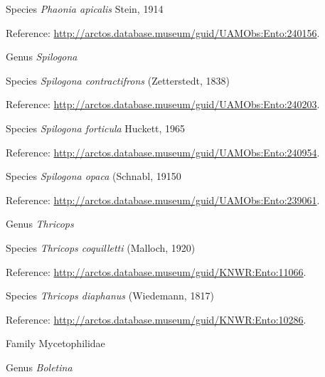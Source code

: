 \documentclass[9pt, article]{memoir}
\begin{document}
\begin{multicols}{2}
\vspace{6pt}\noindent\hspace{36pt}Species \textit{Phaonia apicalis} Stein, 1914


Reference: 
\url{http://arctos.database.museum/guid/UAMObs:Ento:240156}.

\vspace{6pt}\noindent\hspace{30pt}Genus \textit{Spilogona}


\vspace{6pt}\noindent\hspace{36pt}Species \textit{Spilogona contractifrons} (Zetterstedt, 1838)


Reference: 
\url{http://arctos.database.museum/guid/UAMObs:Ento:240203}.

\vspace{6pt}\noindent\hspace{36pt}Species \textit{Spilogona forticula} Huckett, 1965


Reference: 
\url{http://arctos.database.museum/guid/UAMObs:Ento:240954}.

\vspace{6pt}\noindent\hspace{36pt}Species \textit{Spilogona opaca} (Schnabl, 19150


Reference: 
\url{http://arctos.database.museum/guid/UAMObs:Ento:239061}.

\vspace{6pt}\noindent\hspace{30pt}Genus \textit{Thricops}


\vspace{6pt}\noindent\hspace{36pt}Species \textit{Thricops coquilletti} (Malloch, 1920)


Reference: 
\url{http://arctos.database.museum/guid/KNWR:Ento:11066}.

\vspace{6pt}\noindent\hspace{36pt}Species \textit{Thricops diaphanus} (Wiedemann, 1817)


Reference: 
\url{http://arctos.database.museum/guid/KNWR:Ento:10286}.

\vspace{6pt}\noindent\hspace{24pt}Family Mycetophilidae


\vspace{6pt}\noindent\hspace{30pt}Genus \textit{Boletina}



\end{multicols}
\end{document}
